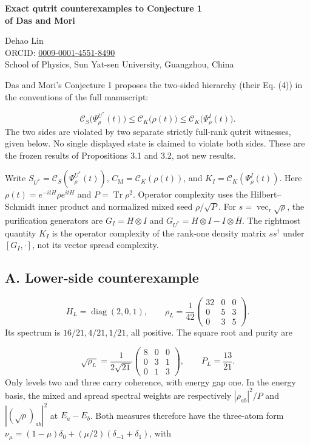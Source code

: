 \documentclass[11pt,a4paper]{article}
\begin{document}
\begin{center}
{\Large\bfseries Exact qutrit counterexamples to Conjecture 1\\[3pt]of Das and Mori}\par
\vspace{4pt}
Dehao Lin\\
{\small ORCID: \href{https://orcid.org/0009-0001-4551-8490}{0009-0001-4551-8490}}\\
{\small School of Physics, Sun Yat-sen University, Guangzhou, China}
\end{center}
Das and Mori's Conjecture 1 proposes the two-sided hierarchy (their Eq. (4))
in the conventions of the full manuscript:

\[
\mathcal C_S\bigl(\Psi_\rho^{U^*}(t)\bigr)
\le \mathcal C_K\bigl(\rho(t)\bigr)
\le \mathcal C_K\bigl(\Psi_\rho^I(t)\bigr).
\]
The two sides are violated by two separate strictly full-rank qutrit witnesses,
given below. No single displayed state is claimed to violate both sides.
These are the frozen results of Propositions 3.1 and 3.2, not new results.

Write $S_{U^*}=\mathcal C_S(\Psi_\rho^{U^*}(t))$,
$C_{\mathrm M}=\mathcal C_K(\rho(t))$, and $K_I=\mathcal C_K(\Psi_\rho^I(t))$.
Here $\rho(t)=e^{-itH}\rho e^{itH}$ and $P=\operatorname{Tr}\rho^2$.
Operator complexity uses the Hilbert--Schmidt inner product and normalized mixed
seed $\rho/\sqrt P$. For $s=\operatorname{vec}_{\mathrm r}\sqrt\rho$,
the purification generators are $G_I=H\otimes I$ and
$G_{U^*}=H\otimes I-I\otimes\overline H$.
The rightmost quantity $K_I$ is the operator complexity of the rank-one density
matrix $ss^\dagger$ under $[G_I,\cdot]$, not its vector spread complexity.

\subsection*{A. Lower-side counterexample}
\[
H_L=\operatorname{diag}(2,0,1),\qquad
\rho_L=\frac1{42}\begin{pmatrix}32&0&0\\0&5&3\\0&3&5\end{pmatrix}.
\]
Its spectrum is $16/21,4/21,1/21$, all positive. The square root and purity are

\[
\sqrt{\rho_L}=\frac1{2\sqrt{21}}
\begin{pmatrix}8&0&0\\0&3&1\\0&1&3\end{pmatrix},\qquad P_L=\frac{13}{21}.
\]
Only levels two and three carry coherence, with energy gap one.
In the energy basis, the mixed and spread spectral weights are respectively
$|\rho_{ab}|^2/P$ and $|(\sqrt\rho)_{ab}|^2$ at $E_a-E_b$.
Both measures therefore have the three-atom form
$\nu_\mu=(1-\mu)\delta_0+(\mu/2)(\delta_{-1}+\delta_1)$, with
\end{document}
